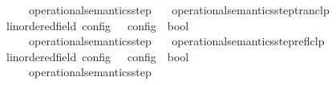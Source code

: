 \begin{isabellebody}
\isanewline
\ \ {\isacartoucheopen}{\isasymC}\ {\isasymhookrightarrow}\isactrlsup {\isacharasterisk}\isactrlsup {\isacharasterisk}\ {\isasymC}\ {\isasymequiv}\ operational{\isacharunderscore}semantics{\isacharunderscore}step\isactrlsup {\isacharasterisk}\isactrlsup {\isacharasterisk}\ {\isasymC}\ {\isasymC}\isanewline
\isanewline
{}\isamarkupfalse%
\ operational{\isacharunderscore}semantics{\isacharunderscore}step{\isacharunderscore}tranclp\isanewline
\ \ {\isacharcolon}{\isacharcolon}{\isacartoucheopen}{\isacharparenleft}{\isacharprime}{\isasymtau}{\isacharcolon}{\isacharcolon}linordered{\isacharunderscore}field{\isacharparenright}\ config\ {\isasymRightarrow}\ {\isacharprime}{\isasymtau}\ config\ {\isasymRightarrow}\ bool{\isacartoucheclose}\ \ \ \ \ \ \ \ \ \ \ \ \ \ {\isacharparenleft}{\isachardoublequoteopen}{\isacharunderscore}\ {\isasymhookrightarrow}\isactrlsup {\isacharplus}\isactrlsup {\isacharplus}\ {\isacharunderscore}{\isachardoublequoteclose}\ {}{}{\isacharparenright}\isanewline
{}\isanewline
\ \ {\isacartoucheopen}{\isasymC}\ {\isasymhookrightarrow}\isactrlsup {\isacharplus}\isactrlsup {\isacharplus}\ {\isasymC}\ {\isasymequiv}\ operational{\isacharunderscore}semantics{\isacharunderscore}step\isactrlsup {\isacharplus}\isactrlsup {\isacharplus}\ {\isasymC}\ {\isasymC}\isanewline
\isanewline
{}\isamarkupfalse%
\ operational{\isacharunderscore}semantics{\isacharunderscore}step{\isacharunderscore}reflclp\isanewline
\ \ {\isacharcolon}{\isacharcolon}{\isacartoucheopen}{\isacharparenleft}{\isacharprime}{\isasymtau}{\isacharcolon}{\isacharcolon}linordered{\isacharunderscore}field{\isacharparenright}\ config\ {\isasymRightarrow}\ {\isacharprime}{\isasymtau}\ config\ {\isasymRightarrow}\ bool{\isacartoucheclose}\ \ \ \ \ \ \ \ \ \ \ \ \ \ {\isacharparenleft}{\isachardoublequoteopen}{\isacharunderscore}\ {\isasymhookrightarrow}\isactrlsup {\isacharequal}\isactrlsup {\isacharequal}\ {\isacharunderscore}{\isachardoublequoteclose}\ {}{}{\isacharparenright}\isanewline
{}\isanewline
\ \ {\isacartoucheopen}{\isasymC}\ {\isasymhookrightarrow}\isactrlsup {\isacharequal}\isactrlsup {\isacharequal}\ {\isasymC}\ {\isasymequiv}\ operational{\isacharunderscore}semantics{\isacharunderscore}step\isactrlsup {\isacharequal}\isactrlsup {\isacharequal}\ {\isasymC}\ {\isasymC}\isanewline

\end{isabellebody}

